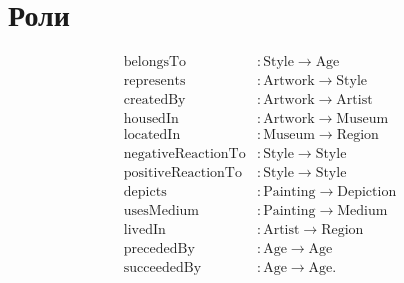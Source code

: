 \documentclass[a4paper, 11pt]{article}
\begin{document}
\section*{Роли}
\begin{align*}
  \text{belongsTo} &: \text{Style} \to \text{Age}\\
  \text{represents} &: \text{Artwork} \to \text{Style}\\
  \text{createdBy} &: \text{Artwork} \to \text{Artist}\\
  \text{housedIn} &: \text{Artwork} \to \text{Museum}\\
  \text{locatedIn} &: \text{Museum} \to \text{Region}\\
  \text{negativeReactionTo} &: \text{Style} \to \text{Style}\\
  \text{positiveReactionTo} &: \text{Style} \to \text{Style}\\
  \text{depicts} &: \text{Painting} \to \text{Depiction}\\
  \text{usesMedium} &: \text{Painting} \to \text{Medium}\\
  \text{livedIn} &: \text{Artist} \to \text{Region}\\
  \text{precededBy} &: \text{Age} \to \text{Age}\\
  \text{succeededBy} &: \text{Age} \to \text{Age}.
\end{align*}
\end{document}
